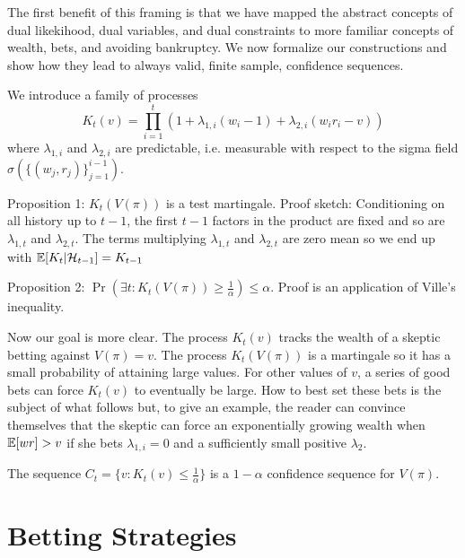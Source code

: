 The first
benefit of this framing is that we have 
mapped the abstract concepts of dual likekihood,
dual variables, and dual constraints to more familiar 
concepts of wealth, bets, and avoiding bankruptcy. 
We now formalize our constructions and
show how they lead to always valid, finite sample, 
confidence sequences.

We introduce a family of processes
\[
K_t(v) = \prod_{i=1}^t (1+\lambda_{1,i} (w_i-1) +\lambda_{2,i}(w_i r_i - v))
\]
where $\lambda_{1,i}$ and $\lambda_{2,i}$ are predictable, i.e. measurable
with respect to the sigma field $\sigma(\{(w_j,r_j)\}_{j=1}^{i-1})$.

Proposition 1: $K_t(V(\pi))$ is a test martingale. Proof sketch:
Conditioning on all history up to 
$t-1$, the first $t-1$ factors in the product are fixed and so are $\lambda_{1,t}$ and $\lambda_{2,t}$. The terms multiplying $\lambda_{1,t}$ and $\lambda_{2,t}$ are zero mean
so we end up with $\mathbb{E}[K_t|\mathcal{H}_{t-1}] = K_{t-1}$

Proposition 2: $\Pr(\exists t: K_t(V(\pi)) \geq \frac{1}{\alpha})\leq \alpha$. Proof is an application of Ville's inequality.

Now our goal is more clear. The process $K_t(v)$ tracks the wealth
of a skeptic betting against
$V(\pi)=v$. The process $K_t(V(\pi))$ is a martingale so it has
a small probability of attaining large values. For other values 
of $v$, a series of good bets can force $K_t(v)$ to eventually
be large. How to best set these bets is the subject of what follows
but, to give an example, the reader can convince themselves that 
the skeptic can force an exponentially growing wealth when $\mathbb{E}[wr]>v$ 
if she bets $\lambda_{1,i}=0$ and a sufficiently small positive $\lambda_2$. 

\begin{theorem}
\label{thm:cs}
The sequence $C_t = \{v:K_t(v)\leq \frac{1}{\alpha}\}$ is a $1-\alpha$ confidence sequence for $V(\pi)$.
\end{theorem}

\section{Betting Strategies}

